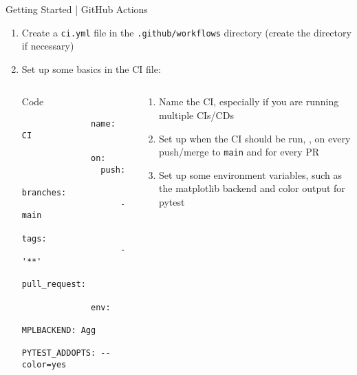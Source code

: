 \begin{frame}[fragile]{
    Getting Started | GitHub Actions
    \hfill
  }
  \begin{enumerate}
    \item Create a \texttt{ci.yml} file in the \texttt{.github/workflows}
        directory (create the directory if necessary)
    \item Set up some basics in the CI file:
      \begin{columns}[t, onlytextwidth]
        \begin{column}{0.52\textwidth}
          \begin{block}{Code}
            \footnotesize
            \begin{verbatim}
              name: CI

              on:
                push:
                  branches:
                    - main
                  tags:
                    - '**'
                pull_request:

              env:
                MPLBACKEND: Agg
                PYTEST_ADDOPTS: --color=yes
            \end{verbatim}
          \end{block}
        \end{column}
        \begin{column}{0.44\textwidth}
          \pause
          \begin{enumerate}
            \setlength{\itemsep}{1em}
            \item <2-> Name the CI, especially if you are running multiple CIs/CDs
            \item <3-> Set up when the CI should be run, \eg, on every push/merge to \texttt{main}
              and for every PR
            \item <4-> Set up some environment variables, such as the matplotlib backend and color output for pytest
          \end{enumerate}
        \end{column}
      \end{columns}
  \end{enumerate}
\end{frame}

